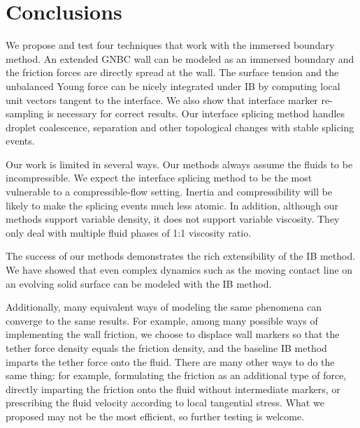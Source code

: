 \documentclass{jfm}
\newcommand{\daniel}[1]{\todo[inline,color=yellow!40]{Daniel: #1}}
\begin{document}
    

\section{Conclusions} \label{sec:conclusion}
We propose and test four techniques that work with the immersed boundary method. An extended GNBC wall can be modeled as an immersed boundary and the friction forces are directly spread at the wall. The surface tension and the unbalanced Young force can be nicely integrated under IB by computing local unit vectors tangent to the interface. We also show that interface marker re-sampling is necessary for correct results. Our interface splicing method handles droplet coalescence, separation and other topological changes with stable splicing events. 

Our work is limited in several ways. Our methods always assume the fluids to be incompressible. We expect the interface splicing method to be the most vulnerable to a compressible-flow setting. Inertia and compressibility will be likely to make the splicing events much less atomic. In addition, although our methods support variable density, it does not support variable viscosity. They only deal with multiple fluid phases of 1:1 viscosity ratio. 

The success of our methods demonstrates the rich extensibility of the IB method. We have showed that even complex dynamics such as the moving contact line on an evolving solid surface can be modeled with the IB method. 

Additionally, many equivalent ways of modeling the same phenomena can converge to the same results. For example, among many possible ways of implementing the wall friction, we choose to displace wall markers so that the tether force density equals the friction density, and the baseline IB method imparts the tether force onto the fluid. There are many other ways to do the same thing: for example, formulating the friction as an additional type of force, directly imparting the friction onto the fluid without intermediate markers, or prescribing the fluid velocity according to local tangential stress. What we proposed may not be the most efficient, so further testing is welcome. 
\daniel{I don't know, drop the last paragraph?}
\end{document}

